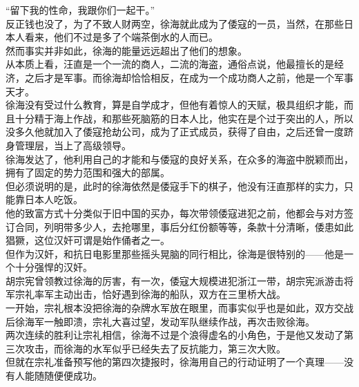 \begin{multicols}{\theparacolNo}
“留下我的性命，我跟你们一起干。”\\

反正钱也没了，为了不致人财两空，徐海就此成为了倭寇的一员，当然，在那些日本人看来，他们不过是多了个端茶倒水的人而已。\\

然而事实并非如此，徐海的能量远远超出了他们的想象。\\

从本质上看，汪直是一个一流的商人，二流的海盗，通俗点说，他最擅长的是经济，之后才是军事。而徐海却恰恰相反，在成为一个成功商人之前，他是一个军事天才。\\

徐海没有受过什么教育，算是自学成才，但他有着惊人的天赋，极具组织才能，而且十分精于海上作战，和那些死脑筋的日本人比，他实在是个过于突出的人，所以没多久他就加入了倭寇抢劫公司，成为了正式成员，获得了自由，之后还曾一度跻身管理层，当上了高级领导。\\

徐海发达了，他利用自己的才能和与倭寇的良好关系，在众多的海盗中脱颖而出，拥有了固定的势力范围和强大的部属。\\

但必须说明的是，此时的徐海依然是倭寇手下的棋子，他没有汪直那样的实力，只能靠日本人吃饭。\\

他的致富方式十分类似于旧中国的买办，每次带领倭寇进犯之前，他都会与对方签订合同，列明带多少人，去抢哪里，事后分红份额等等，条款十分清晰，倭患如此猖獗，这位汉奸可谓是始作俑者之一。\\

但作为汉奸，和抗日电影里那些摇头晃脑的同行相比，徐海是很特别的——他是一个十分强悍的汉奸。\\

胡宗宪曾领教过徐海的厉害，有一次，倭寇大规模进犯浙江一带，胡宗宪派游击将军宗礼率军主动出击，恰好遇到徐海的船队，双方在三里桥大战。\\

一开始，宗礼根本没把徐海的杂牌水军放在眼里，而事实似乎也是如此，双方交战后徐海军一触即溃，宗礼大喜过望，发动军队继续作战，再次击败徐海。\\

两次连续的胜利让宗礼相信，徐海不过是个浪得虚名的小角色，于是他又发动了第三次攻击，而徐海的水军似乎已经失去了反抗能力，第三次大败。\\

但就在宗礼准备预写他的第四次捷报时，徐海用自己的行动证明了一个真理——没有人能随随便便成功。\\


\end{multicols}
